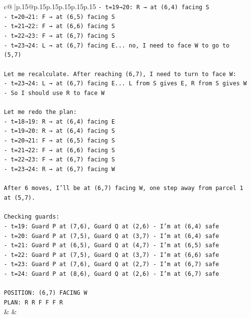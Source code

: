 \documentclass{article}
\begin{document}
{\begin{supertabular}{c@{$\;$}|p{.15\linewidth}@{}p{.15\linewidth}p{.15\linewidth}p{.15\linewidth}p{.15\linewidth}p{.15\linewidth}}
{{{\texttt{{-} t=19→20: R → at (6,4) facing S} \\
\texttt{{-} t=20→21: F → at (6,5) facing S} \\
\texttt{{-} t=21→22: F → at (6,6) facing S} \\
\texttt{{-} t=22→23: F → at (6,7) facing S} \\
\texttt{{-} t=23→24: L → at (6,7) facing E... no, I need to face W to go to (5,7)} \\
\\ 
\texttt{Let me recalculate. After reaching (6,7), I need to turn to face W:} \\
\texttt{{-} t=23→24: L → at (6,7) facing E... L from S gives E, R from S gives W} \\
\texttt{{-} So I should use R to face W} \\
\\ 
\texttt{Let me redo the plan:} \\
\texttt{{-} t=18→19: R → at (6,4) facing E} \\
\texttt{{-} t=19→20: R → at (6,4) facing S} \\
\texttt{{-} t=20→21: F → at (6,5) facing S} \\
\texttt{{-} t=21→22: F → at (6,6) facing S} \\
\texttt{{-} t=22→23: F → at (6,7) facing S} \\
\texttt{{-} t=23→24: R → at (6,7) facing W} \\
\\ 
\texttt{After 6 moves, I'll be at (6,7) facing W, one step away from parcel 1 at (5,7).} \\
\\ 
\texttt{Checking guards:} \\
\texttt{{-} t=19: Guard P at (7,6), Guard Q at (2,6) {-} I'm at (6,4) safe} \\
\texttt{{-} t=20: Guard P at (7,5), Guard Q at (3,7) {-} I'm at (6,4) safe} \\
\texttt{{-} t=21: Guard P at (6,5), Guard Q at (4,7) {-} I'm at (6,5) safe} \\
\texttt{{-} t=22: Guard P at (7,5), Guard Q at (3,7) {-} I'm at (6,6) safe} \\
\texttt{{-} t=23: Guard P at (7,6), Guard Q at (2,7) {-} I'm at (6,7) safe} \\
\texttt{{-} t=24: Guard P at (8,6), Guard Q at (2,6) {-} I'm at (6,7) safe} \\
\\ 
\texttt{POSITION: (6,7) FACING W} \\
\texttt{PLAN: R R F F F R} \\
            }
        }
    }
    & & \\ \\


\end{supertabular}}
\end{document}
